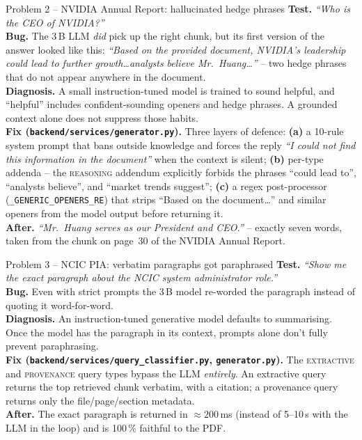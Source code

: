 \documentclass[11pt,a4paper]{article}
\begin{document}
\begin{problembox}{Problem 2 -- NVIDIA Annual Report: hallucinated hedge phrases}
\textbf{Test.}
\textit{``Who is the CEO of NVIDIA?''}\\[2pt]
\textbf{Bug.}
The 3\,B LLM \emph{did} pick up the right chunk, but its first version of
the answer looked like this:
\textit{``Based on the provided document, NVIDIA's leadership could lead
to further growth\ldots analysts believe Mr.~Huang\ldots''} -- two hedge
phrases that do not appear anywhere in the document.\\[2pt]
\textbf{Diagnosis.}
A small instruction-tuned model is trained to sound helpful, and
``helpful'' includes confident-sounding openers and hedge phrases. A
grounded context alone does not suppress those habits.\\[2pt]
\textbf{Fix (\texttt{backend/services/generator.py}).}
Three layers of defence:
\textbf{(a)} a 10-rule system prompt that bans outside knowledge and
forces the reply \textit{``I could not find this information in the
document''} when the context is silent;
\textbf{(b)} per-type addenda -- the \textsc{reasoning} addendum
explicitly forbids the phrases ``could lead to'', ``analysts believe'',
and ``market trends suggest'';
\textbf{(c)} a regex post-processor (\texttt{\_GENERIC\_OPENERS\_RE}) that
strips ``Based on the document\ldots'' and similar openers from the model
output before returning it.\\[2pt]
\textbf{After.}
\textit{``Mr.\ Huang serves as our President and CEO.''} -- exactly seven
words, taken from the chunk on page~30 of the NVIDIA Annual Report.
\end{problembox}

\begin{problembox}{Problem 3 -- NCIC PIA: verbatim paragraphs got paraphrased}
\textbf{Test.}
\textit{``Show me the exact paragraph about the NCIC system administrator
role.''}\\[2pt]
\textbf{Bug.}
Even with strict prompts the 3\,B model re-worded the paragraph instead of
quoting it word-for-word.\\[2pt]
\textbf{Diagnosis.}
An instruction-tuned generative model defaults to summarising. Once the
model has the paragraph in its context, prompts alone don't fully prevent
paraphrasing.\\[2pt]
\textbf{Fix (\texttt{backend/services/query\_classifier.py},
\texttt{generator.py}).}
The \textsc{extractive} and \textsc{provenance} query types bypass the LLM
\emph{entirely}. An extractive query returns the top retrieved chunk
verbatim, with a citation; a provenance query returns only the
file/page/section metadata.\\[2pt]
\textbf{After.}
The exact paragraph is returned in $\approx\!200$\,ms (instead of
5--10\,s with the LLM in the loop) and is 100\,\% faithful to the
PDF.
\end{problembox}
\end{document}
